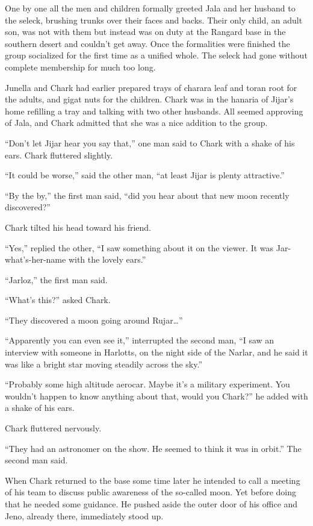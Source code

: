 One by one all the men and children formally greeted Jala and her husband to the seleck,
brushing trunks over their faces and backs. Their only child, an adult son, was not with them
but instead was on duty at the Rangard base in the southern desert and couldn't get away. Once
the formalities were finished the group socialized for the first time as a unified whole. The
seleck had gone without complete membership for much too long.


Junella and Chark had earlier prepared trays of charara leaf and toran root for the adults, and
gigat nuts for the children. Chark was in the hanaria of Jijar's home refilling a tray and
talking with two other husbands. All seemed approving of Jala, and Chark admitted that she was a
nice addition to the group.

``Don't let Jijar hear you say that,'' one man said to Chark with a shake of his ears. Chark
fluttered slightly.

``It could be worse,'' said the other man, ``at least Jijar is plenty attractive.''

``By the by,'' the first man said, ``did you hear about that new moon recently discovered?''

Chark tilted his head toward his friend.

``Yes,'' replied the other, ``I saw something about it on the viewer. It was Jar-what's-her-name
with the lovely ears.''

``Jarloz,'' the first man said.

``What's this?'' asked Chark.

``They discovered a moon going around Rujar\ldots''

``Apparently you can even see it,'' interrupted the second man, ``I saw an interview with
someone in Harlotts, on the night side of the Narlar, and he said it was like a bright star
moving steadily across the sky.''

``Probably some high altitude aerocar. Maybe it's a military experiment. You wouldn't happen to
know anything about that, would you Chark?'' he added with a shake of his ears.


Chark fluttered nervously.

``They had an astronomer on the show. He seemed to think it was in orbit.'' The second man
said.

When Chark returned to the base some time later he intended to call a meeting of his team to
discuss public awareness of the so-called moon. Yet before doing that he needed some guidance.
He pushed aside the outer door of his office and Jeno, already there, immediately stood up.

